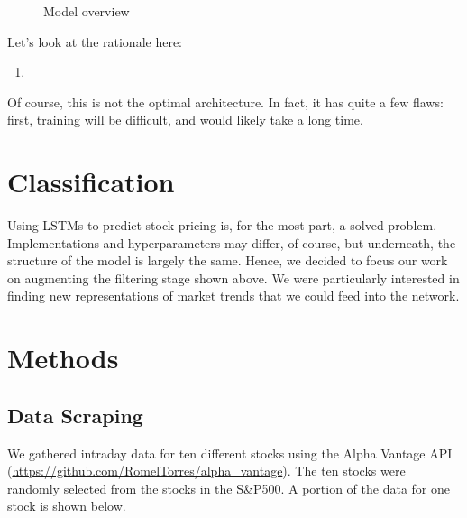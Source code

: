 \documentclass[final]{article}
\begin{document}
\begin{figure}[H]
  \caption{Model overview}
  \label{fig:goal}
\end{figure}
Let's look at the rationale here:
\begin{enumerate}
  \item
\end{enumerate}

Of course, this is not the optimal architecture. In fact, it has quite
a few flaws: first, training will be difficult, and would likely take
a long time.

\section{Classification}
Using LSTMs to predict stock pricing is, for the most part, a solved
problem. Implementations and hyperparameters may differ, of course,
but underneath, the structure of the model is largely the same. Hence,
we decided to focus our work on augmenting the filtering stage shown
above. We were particularly interested in finding new representations
of market trends that we could feed into the network.

\section{Methods}

\subsection{Data Scraping}
We gathered intraday data for ten different stocks using the Alpha Vantage API
(\url{https://github.com/RomelTorres/alpha_vantage}). The ten stocks were
randomly selected from the stocks in the S\&P500. A portion of the data for one
stock is shown below.
\end{document}
